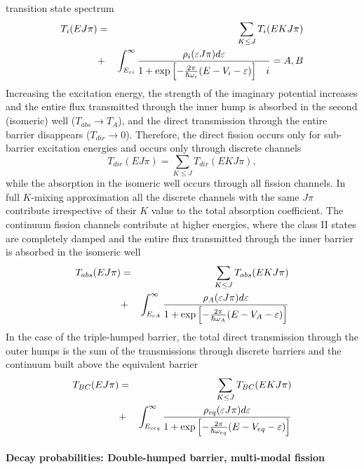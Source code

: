 transition state spectrum
\begin{eqnarray}
T_{i}(EJ\pi)&=&\sum_{K\leq J}T_{i}(EKJ\pi) \\
&+&\int_{E_{ci}}^{\infty}\frac{\rho_{i}(\varepsilon J\pi)d\varepsilon}{{%
1+\exp\left[-\frac{2\pi}{\hbar\omega_{i}}(E-V_{i}-\varepsilon)\right]}\quad i%
}=A,B  \nonumber  \label{tjt}
\end{eqnarray}
Increasing the excitation energy, the strength of the imaginary potential
increases and the entire flux transmitted through the inner hump is absorbed
in the second (isomeric) well ($T_{abs}\rightarrow T_{A}$), and the direct
transmission through the entire barrier disappears ($T_{dir}\rightarrow0$).
Therefore, the direct fission occurs only for sub-barrier excitation
energies and occurs only through discrete channels
\begin{equation}
T_{dir}(EJ\pi)=\sum_{K\leq J}T_{dir}(EKJ\pi),  \label{tdirt}
\end{equation}
while the absorption in the isomeric well occurs through all fission
channels. In full $K$-mixing approximation all the discrete channels with
the same $J\pi$ contribute irrespective of their $K$ value to the total
absorption coefficient. The continuum fission channels contribute at higher
energies, where the class II states are completely damped and the entire
flux transmitted through the inner barrier is absorbed in the isomeric%
 well
\begin{eqnarray}
T_{abs}(EJ\pi)&=&\sum_{K\leq J}T_{abs}(EKJ\pi) \\
&+&\int_{E_{cA}}^{\infty}%
\frac{\rho_{A}(\varepsilon J\pi)d\varepsilon}{{1+\exp\left[-\frac{2\pi}{%
\hbar\omega_{A}}(E-V_{A}-\varepsilon)\right]}}  \nonumber  \label{tabst}
\end{eqnarray}
In the case of the triple-humped barrier, the total direct transmission
through the outer humps is the sum of the transmissions through discrete
barriers and the continuum built above the equivalent barrier
\begin{eqnarray}
T_{BC}(EJ\pi)&=&\sum_{K\leq J}T_{BC}(EKJ\pi) \\
&+&\int_{E_{ceq}}^{\infty}\frac{\rho_{eq}(\varepsilon J\pi)d\varepsilon}{{%
1+\exp\left[-\frac{2\pi}{\hbar\omega_{eq}}(E-V_{eq}-\varepsilon)\right]}}
\nonumber  \label{tdir23t}
\end{eqnarray}

\paragraph{Decay probabilities: Double-humped barrier, multi-modal fission}

